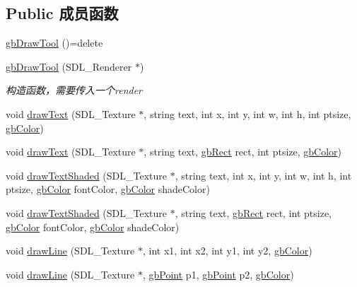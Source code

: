 \subsection*{Public 成员函数}
\begin{DoxyCompactItemize}
\item 
\mbox{\hyperlink{classgb_draw_tool_a6de82219b479d3f2daf1e48d2a22c6c3}{gb\+Draw\+Tool}} ()=delete
\item 
\mbox{\hyperlink{classgb_draw_tool_a63c04389a520c9dba4901a340eca5358}{gb\+Draw\+Tool}} (S\+D\+L\+\_\+\+Renderer $\ast$)
\begin{DoxyCompactList}\small\item\em 构造函数，需要传入一个render \end{DoxyCompactList}\item 
void \mbox{\hyperlink{classgb_draw_tool_a5e511da5367f80b3fbdf005639977b65}{draw\+Text}} (S\+D\+L\+\_\+\+Texture $\ast$, string text, int x, int y, int w, int h, int ptsize, \mbox{\hyperlink{classgb_color}{gb\+Color}})
\item 
void \mbox{\hyperlink{classgb_draw_tool_ad3799e4d8fff8aab5d25b7cacefd001e}{draw\+Text}} (S\+D\+L\+\_\+\+Texture $\ast$, string text, \mbox{\hyperlink{classgb_rect}{gb\+Rect}} rect, int ptsize, \mbox{\hyperlink{classgb_color}{gb\+Color}})
\item 
void \mbox{\hyperlink{classgb_draw_tool_ac962b836d901020566bb601c895a61d6}{draw\+Text\+Shaded}} (S\+D\+L\+\_\+\+Texture $\ast$, string text, int x, int y, int w, int h, int ptsize, \mbox{\hyperlink{classgb_color}{gb\+Color}} font\+Color, \mbox{\hyperlink{classgb_color}{gb\+Color}} shade\+Color)
\item 
void \mbox{\hyperlink{classgb_draw_tool_a44ea1eb3cba4d6c52f6b26d83e08c6f7}{draw\+Text\+Shaded}} (S\+D\+L\+\_\+\+Texture $\ast$, string text, \mbox{\hyperlink{classgb_rect}{gb\+Rect}} rect, int ptsize, \mbox{\hyperlink{classgb_color}{gb\+Color}} font\+Color, \mbox{\hyperlink{classgb_color}{gb\+Color}} shade\+Color)
\item 
void \mbox{\hyperlink{classgb_draw_tool_a8826be594e9b5b80e03f75dd69f07eb8}{draw\+Line}} (S\+D\+L\+\_\+\+Texture $\ast$, int x1, int x2, int y1, int y2, \mbox{\hyperlink{classgb_color}{gb\+Color}})
\item 
void \mbox{\hyperlink{classgb_draw_tool_a70eb8954ce054fca2c7aab73beafa211}{draw\+Line}} (S\+D\+L\+\_\+\+Texture $\ast$, \mbox{\hyperlink{classgb_point}{gb\+Point}} p1, \mbox{\hyperlink{classgb_point}{gb\+Point}} p2, \mbox{\hyperlink{classgb_color}{gb\+Color}})
\item 

\end{DoxyCompactItemize}
